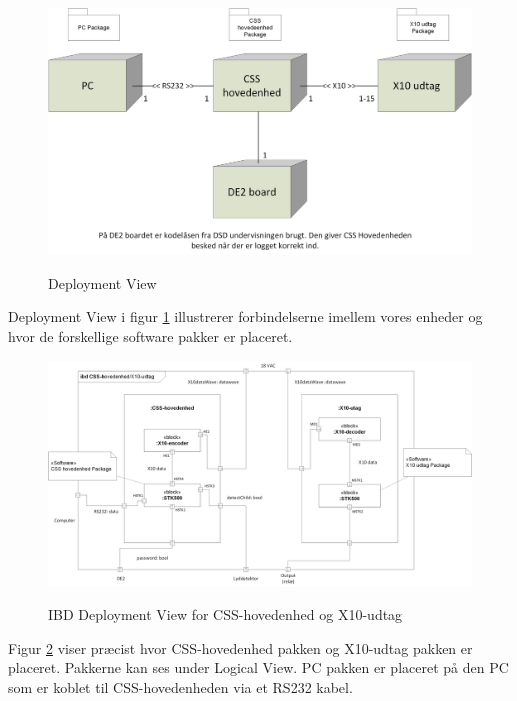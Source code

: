 
\begin{figure}[!htb]
     {\includegraphics[width=\textwidth]{billeder/uml/deployment_model}}
     \caption{Deployment View}
     \label{fig:Deployment model}
\end{figure}

Deployment View i figur \ref{fig:Deployment model} illustrerer forbindelserne imellem vores enheder og hvor de forskellige software pakker er placeret.

\begin{figure}[!htb]
     {\includegraphics[width=\textwidth]{billeder/uml/CSS_Hovedenhed_modtager_deployment}}
     \caption{IBD Deployment View for CSS-hovedenhed og X10-udtag }
     \label{fig:IBD Deployment model}
\end{figure}

Figur \ref{fig:IBD Deployment model} viser præcist hvor CSS-hovedenhed pakken og X10-udtag pakken er placeret. Pakkerne kan ses under Logical View. PC pakken er placeret på den PC som er koblet til CSS-hovedenheden via et RS232 kabel.